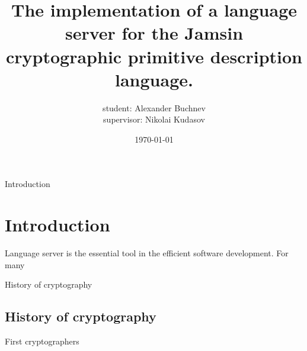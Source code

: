 \documentclass{beamer}
\title{The implementation of a language server for the Jamsin cryptographic primitive description language.}
\author{student: Alexander Buchnev\\supervisor: Nikolai Kudasov}
\date{\monthYear\today}
\begin{document}
\frame{
	\titlepage
}


\begin{frame}{Introduction}
    \section{Introduction}
    Language server is the essential tool in the efficient software development. For many
\end{frame}

\begin{frame}{History of cryptography}
    \subsection{History of cryptography}
    \begin{center}
        \begin{minipage}{0.48\linewidth}
        \end{minipage}
        
        \hfill
        
        \begin{minipage}{0.49\linewidth}
        \end{minipage}
        
    \end{center}
\end{frame}

\begin{frame}{First cryptographers}
    \begin{center}
        \begin{minipage}{0.45\linewidth}
        \end{minipage}
        \hfill
        \begin{minipage}{0.45\linewidth}
            \begin{center}
            \end{center}
        \end{minipage}            
    \end{center}
\end{frame}
\end{document}
